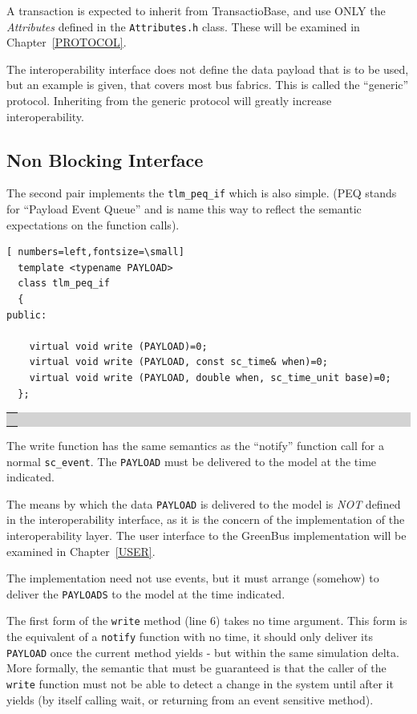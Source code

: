 \documentclass[12pt,oneside]{gsbook}
\newcommand{\quarks}{{\em Attributes}\xspace}
\def\example#1{\begin{center}\colorbox{lightgrey}{\begin{tabular}{|p{0.6\paperwidth}|}\hline\\#1\\ \\ \hline\end{tabular}}\end{center}}
\newenvironment{exampleenv}{\begin{lrbox}{\examplebox}\begin{minipage}{0.6\paperwidth}}{\end{minipage}\end{lrbox}\example{\usebox{\examplebox}}}
\begin{document}
A transaction is expected to inherit from TransactioBase, and use ONLY
the \quarks defined in the {\tt Attributes.h} class. These will be
examined in Chapter~\ref{PROTOCOL}.

The interoperability interface
does not define the data payload that is to be used, but an example is
given, that covers most bus fabrics. This is called the ``generic''
protocol. Inheriting from the generic protocol will greatly increase
interoperability.


\subsection{Non Blocking Interface}
The second pair implements the {\tt tlm\_peq\_if} which is also
simple. (PEQ stands for ``Payload Event Queue'' and is name this way
to reflect the semantic expectations on the function calls).


\begin{exampleenv}
\begin{Verbatim}[ numbers=left,fontsize=\small]
  template <typename PAYLOAD>
  class tlm_peq_if
  {
public:
    
    virtual void write (PAYLOAD)=0;
    virtual void write (PAYLOAD, const sc_time& when)=0;
    virtual void write (PAYLOAD, double when, sc_time_unit base)=0;
  };
\end{Verbatim}
\end{exampleenv}

The write function has the same semantics as the ``notify'' function
call for a normal {\tt sc\_event}. The {\tt PAYLOAD} must be delivered
to the model at the time indicated.

The means by which the data {\tt PAYLOAD} is delivered to the model is {\em
NOT} defined in the interoperability interface, as it is the concern
of the implementation of the interoperability layer. The user interface to
the GreenBus implementation will be examined in Chapter~\ref{USER}.

The implementation need not use events, but it must arrange (somehow)
to deliver the {\tt PAYLOADS} to the model at the time indicated.

The first form of the {\tt write} method (line 6) takes no time
argument. This form is the  equivalent of a {\tt notify} function with
no time, it should
only deliver its {\tt PAYLOAD} once the current method yields - but
within the same simulation delta. More
formally, the semantic that must be guaranteed is that the caller of
the {\tt write} function must not be able to detect a change in the
system until after it yields (by itself calling wait, or returning from
an event sensitive method).
\end{document}
